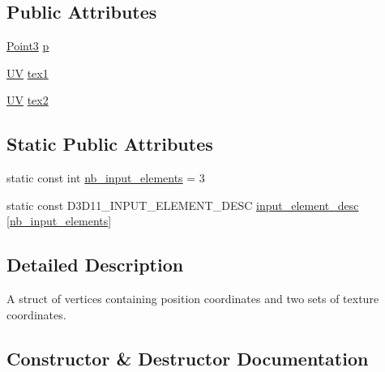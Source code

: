 \subsection*{Public Attributes}
\begin{DoxyCompactItemize}
\item 
\hyperlink{structmage_1_1_point3}{Point3} \hyperlink{structmage_1_1_vertex_position_texture_texture_aed106149eda65a20e60ebc3b93535270}{p}
\item 
\hyperlink{structmage_1_1_u_v}{UV} \hyperlink{structmage_1_1_vertex_position_texture_texture_a96be20a1f6ec9b9b74875099eef80f08}{tex1}
\item 
\hyperlink{structmage_1_1_u_v}{UV} \hyperlink{structmage_1_1_vertex_position_texture_texture_a5a41669f18385d932c1490ff20c80bed}{tex2}
\end{DoxyCompactItemize}
\subsection*{Static Public Attributes}
\begin{DoxyCompactItemize}
\item 
static const int \hyperlink{structmage_1_1_vertex_position_texture_texture_ac15391bbc084b6843ba3b9696b7f502a}{nb\+\_\+input\+\_\+elements} = 3
\item 
static const D3\+D11\+\_\+\+I\+N\+P\+U\+T\+\_\+\+E\+L\+E\+M\+E\+N\+T\+\_\+\+D\+E\+SC \hyperlink{structmage_1_1_vertex_position_texture_texture_a82f271622e34a209d7a3918e7a0190e4}{input\+\_\+element\+\_\+desc} \mbox{[}\hyperlink{structmage_1_1_vertex_position_texture_texture_ac15391bbc084b6843ba3b9696b7f502a}{nb\+\_\+input\+\_\+elements}\mbox{]}
\end{DoxyCompactItemize}


\subsection{Detailed Description}
A struct of vertices containing position coordinates and two sets of texture coordinates. 

\subsection{Constructor \& Destructor Documentation}
\hypertarget{structmage_1_1_vertex_position_texture_texture_a4dd987362b64d278569f9bd043e2cb8b}{}\label{structmage_1_1_vertex_position_texture_texture_a4dd987362b64d278569f9bd043e2cb8b} 
